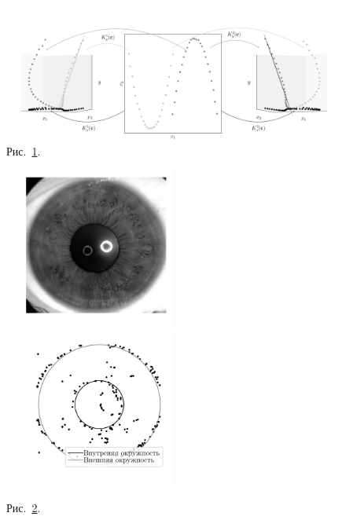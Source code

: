 \documentclass[12pt]{a&t}
\begin{document}
\clearpage
{
\begin{figure}[h!]
  \includegraphics[width=\textwidth]{explanation}
  \caption{Рис.~\ref{intro:fig2}.}
  \label{intro:fig2}
\end{figure}

\begin{figure}[h!]
\includegraphics[width=0.5\textwidth]{real_image}
\includegraphics[width=0.5\textwidth]{outline_image}
\caption{Рис.~\ref{intro:fig1}.}
\label{intro:fig1}
\end{figure}

}
\end{document}
